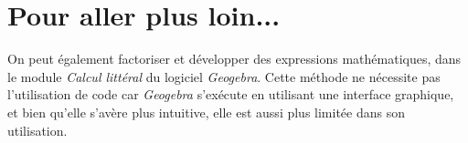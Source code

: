 \section{Pour aller plus loin...}

On peut également factoriser et développer des expressions mathématiques, dans le module \emph{Calcul littéral} du logiciel \emph{Geogebra}. Cette méthode ne nécessite pas l'utilisation de code car \emph{Geogebra} s'exécute en utilisant une interface graphique, et bien qu'elle s'avère plus intuitive, elle est aussi plus limitée dans son utilisation.







